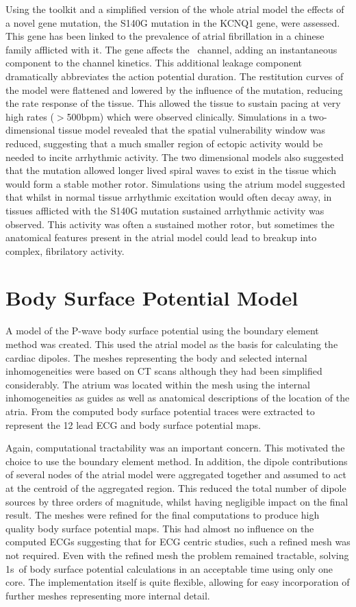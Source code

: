 Using the toolkit and a simplified version of the whole atrial model the
effects of a novel gene mutation, the S140G mutation in the KCNQ1 gene, were
assessed.
This gene has been linked to the prevalence of atrial fibrillation in a chinese
family afflicted with it.
The gene affects the \ channel, adding an instantaneous component to the
channel kinetics.
This additional leakage component dramatically abbreviates the action potential
duration. 
The restitution curves of the model were flattened and lowered by the influence of the
mutation, reducing the rate response of the tissue.
This allowed the tissue to sustain pacing at very high rates
($>$\unit{500}{bpm}) which were observed clinically.
Simulations in a two-dimensional tissue model revealed that the spatial
vulnerability window was reduced, suggesting that a much smaller region of
ectopic activity would be needed to incite arrhythmic activity.
The two dimensional models also suggested that the mutation allowed longer
lived spiral waves to exist in the tissue which would form a stable mother
rotor.
Simulations using the atrium model suggested that whilst in normal tissue
arrhythmic excitation would often decay away, in tissues afflicted with the
S140G mutation sustained arrhythmic activity was observed.
This activity was often a sustained mother rotor, but sometimes the anatomical
features present in the atrial model could lead to breakup into complex,
fibrilatory activity.

\section{Body Surface Potential Model}

A model of the P-wave body surface potential using the boundary element method
was created.
This used the atrial model as the basis for calculating the cardiac dipoles.
The meshes representing the body and selected internal inhomogeneities were
based on CT scans although they had been simplified considerably.
The atrium was located within the mesh using the internal inhomogeneities as
guides as well as anatomical descriptions of the location of the atria.
From the computed body surface potential traces were extracted to represent the
12 lead ECG and body surface potential maps.


Again, computational tractability was an important concern.
This motivated the choice to use the boundary element method.
In addition, the dipole contributions of several nodes of the atrial model were
aggregated together and assumed to act at the centroid of the aggregated region.
This reduced the total number of dipole sources by three orders of magnitude,
whilst having negligible impact on the final result.
The meshes were refined for the final computations to produce high quality body
surface potential maps.
This had almost no influence on the computed ECGs suggesting that for ECG
centric studies, such a refined mesh was not required.
Even with the refined mesh the problem remained tractable, solving \unit{1}{s}\
of body surface potential calculations in an acceptable time using only one
core.
The implementation itself is quite flexible, allowing for easy incorporation of
further meshes representing more internal detail.

